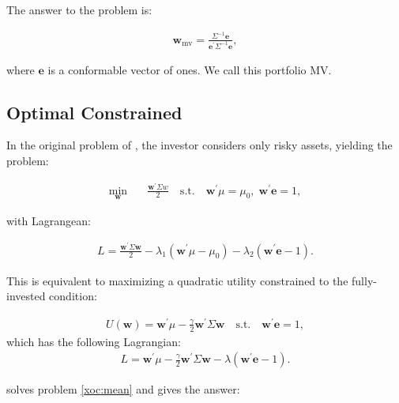 \documentclass[12pt,oneside,a4paper]{memoir}
\begin{document}
The answer to the problem is:

\begin{align}
\label{gmv}
	\mathbf{w}_{\mathrm{mv}} = \frac{\Sigma^{-1}\mathbf{e}}{\mathbf{e}^{\prime}\Sigma^{-1}\mathbf{e}} ,
\end{align}

\noindent
where $\mathbf{e}$ is a conformable vector of ones. We call this portfolio MV.

\subsection{Optimal Constrained}

In the original problem of , the investor considers only risky assets, yielding the problem:

\vspace{-1 em}
\begin{align}
\label{xoc:mean}
\min_{\mathbf{w}}  \quad & \frac{\mathbf{w}^{\prime} \Sigma w}{2} \quad
\mathrm{s.t.} \quad \mathbf{w}^{\prime} \mu = \mu_{0}, \; \mathbf{w}^{\prime} \mathbf{e} = 1,
\end{align}

\noindent
with Lagrangean:

\vspace{-1 em}
\begin{align} \label{L:oc1}
	L = \frac{\mathbf{w}^{\prime} \Sigma \mathbf{w} }{2} - \lambda_{1}(\mathbf{w}^{\prime} \mu - \mu_{0}) - \lambda_{2}(\mathbf{w}^{\prime} \mathbf{e}  - 1).
\end{align}

This is equivalent to maximizing a quadratic utility constrained to the fully-invested condition:

\vspace{-1 em}
\begin{align}
\label{xoc:util}
U(\mathbf{w}) = \mathbf{w}^{\prime}\mu - \frac{\gamma}{2} \mathbf{w}^{\prime}\Sigma \mathbf{w} \quad
\mathrm{s.t.} \quad \mathbf{w}^{\prime}\mathbf{e} = 1,
\end{align}
which has the following Lagrangian:
\begin{align} \label{L:oc1}
	L =  \mathbf{w}^{\prime} \mu - \frac{\gamma}{2}\mathbf{w}^{\prime} \Sigma \mathbf{w}  - \lambda(\mathbf{w}^{\prime} \mathbf{e}  - 1).
\end{align}

 solves problem \eqref{xoc:mean} and gives the answer:
\end{document}
